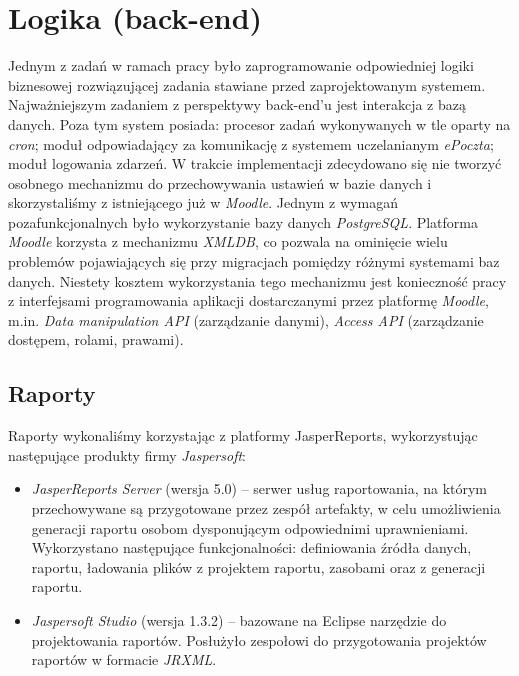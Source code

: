 \section{Logika (back-end)}
\label{Chapter66}

Jednym z zadań w ramach pracy było zaprogramowanie odpowiedniej logiki biznesowej rozwiązującej zadania stawiane przed zaprojektowanym systemem. Najważniejszym zadaniem z perspektywy back-end'u jest interakcja z bazą danych. Poza tym system posiada: procesor zadań wykonywanych w tle oparty na \emph{cron}; moduł odpowiadający za komunikację z systemem uczelanianym \emph{ePoczta}; moduł logowania zdarzeń. W trakcie implementacji zdecydowano się nie tworzyć osobnego mechanizmu do przechowywania ustawień w bazie danych i skorzystaliśmy z istniejącego już w \emph{Moodle}. Jednym z wymagań pozafunkcjonalnych było wykorzystanie bazy danych \emph{PostgreSQL}. Platforma \emph{Moodle} korzysta z mechanizmu \emph{XMLDB}, co pozwala na ominięcie wielu problemów pojawiających się przy migracjach pomiędzy różnymi systemami baz danych. Niestety kosztem wykorzystania tego mechanizmu jest konieczność pracy z interfejsami programowania aplikacji dostarczanymi przez platformę \emph{Moodle}, m.in. \emph{Data manipulation API} (zarządzanie danymi), \emph{Access API} (zarządzanie dostępem, rolami, prawami).\\

\subsection{Raporty}
Raporty wykonaliśmy korzystając z platformy JasperReports, wykorzystując następujące produkty firmy \emph{Jaspersoft}:

\begin{itemize}
\item \emph{JasperReports Server} (wersja 5.0) -- serwer usług raportowania, na którym przechowywane są przygotowane przez zespół artefakty, w celu umożliwienia generacji raportu osobom dysponującym odpowiednimi uprawnieniami. Wykorzystano następujące funkcjonalności: definiowania źródła danych, raportu, ładowania plików z projektem raportu, zasobami oraz z generacji raportu.
\item \emph{Jaspersoft Studio} (wersja 1.3.2) -- bazowane na Eclipse narzędzie do projektowania raportów. Posłużyło zespołowi do przygotowania projektów raportów w formacie \emph{JRXML}.
\end{itemize}

